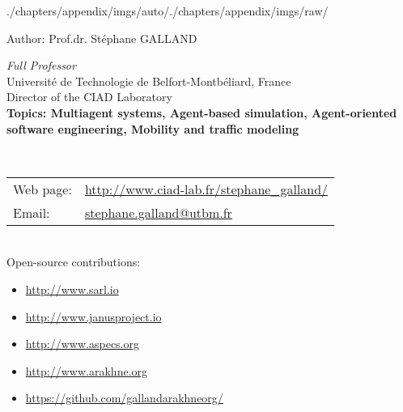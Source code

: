 \begin{graphicspathcontext}{{./chapters/appendix/imgs/auto/}{./chapters/appendix/imgs/raw/}}
\begin{frame}{{Author:} Prof\string.dr\string. St\'ephane GALLAND}
	\begin{minipage}[t]{.75\linewidth}
		\begin{raggedright}
			\textit{Full Professor} \\[.5cm]
			{\scriptsize
				Universit\'e de Technologie de Belfort-Montb\'eliard, France \\
				Director of the CIAD Laboratory} \\[.25cm]
			\textbf{Topics: Multiagent systems, Agent-based simulation, Agent-oriented software engineering, Mobility and traffic modeling} \\[.5cm]
		\end{raggedright}
	\end{minipage}%
	\hfill%
	 \\[.5cm]%
	\begin{raggedright}
		\scriptsize \begin{tabularx}{\linewidth}{@{}lX@{}}
			Web page: & \url{http://www.ciad-lab.fr/stephane_galland/} \\
			Email: & \href{mailto:stephane.galland@utbm.fr}{stephane.galland@utbm.fr} \\
		\end{tabularx} \\[.5cm]
		\scriptsize Open-source contributions:\begin{itemize}\tiny
			\item \url{http://www.sarl.io}
			\item \url{http://www.janusproject.io}
			\item \url{http://www.aspecs.org}
			\item \url{http://www.arakhne.org}
			\item \url{https://github.com/gallandarakhneorg/}
		\end{itemize}
	\end{raggedright}
\end{frame}


\end{graphicspathcontext}
